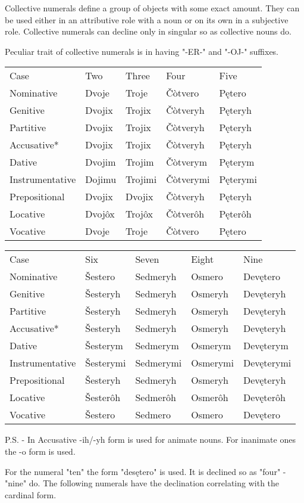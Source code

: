 Collective numerals define a group of objects with some exact amount. They can be used either in an attributive role with a noun or on its own in a subjective role. Collective numerals can decline only in singular so as collective nouns do. 

Peculiar trait of collective numerals is in having "-ER-" and "-OJ-" suffixes.

\begin{table}[!htb]
	\begin{tabular}{lllll}
		Case & Two & Three & Four & Five \\
		Nominative & Dvoje & Troje & Čòtvero & Pętero \\
		Genitive & Dvojix & Trojix & Čòtveryh & Pęteryh \\
		Partitive & Dvojix & Trojix & Čòtveryh & Pęteryh \\
		Accusative* & Dvojix & Trojix & Čòtveryh & Pęteryh \\
		Dative & Dvojim & Trojim & Čòtverym & Pęterym \\
		Instrumentative & Dojimu & Trojimi & Čòtverymi & Pęterymi \\
		Prepositional & Dvojix & Dvojix & Čòtveryh & Pęteryh \\
		Locative & Dvojôx & Trojôx & Čòtverôh & Pęterôh \\
		Vocative & Dvoje & Troje & Čòtvero & Pętero \\
	\end{tabular}
\end{table}

\begin{table}[!htb]
	\begin{tabular}{lllll}
		Case & Six & Seven & Eight & Nine \\
		Nominative & Šestero & Sedmeryh & Osmero & Devętero \\
		Genitive & Šesteryh & Sedmeryh & Osmeryh & Devęteryh \\
		Partitive & Šesteryh & Sedmeryh & Osmeryh & Devęteryh \\
		Accusative* & Šesteryh & Sedmeryh & Osmeryh & Devęteryh \\
		Dative & Šesterym & Sedmerym & Osmerym & Devęterym \\
		Instrumentative & Šesterymi & Sedmerymi & Osmerymi & Devęterymi  \\
		Prepositional & Šesteryh & Sedmeryh & Osmeryh & Devęteryh \\
		Locative & Šesterôh & Sedmerôh & Osmerôh & Devęterôh \\
		Vocative & Šestero & Sedmero & Osmero & Devętero \\
	\end{tabular}
\end{table}

P.S. - In Accusative -ih/-yh form is used for animate nouns. For inanimate ones the -o form is used.

For the numeral "ten" the form "desętero" is used. It is declined so as "four" - "nine" do. The following numerals have the declination correlating with the cardinal form.
